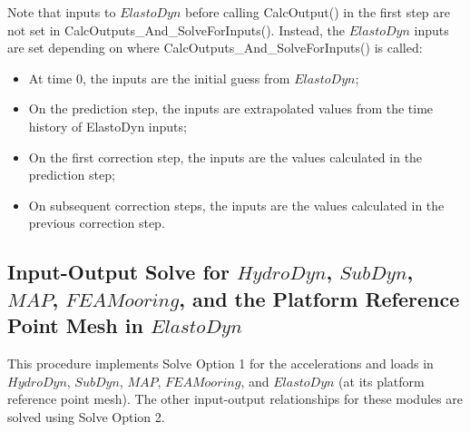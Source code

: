 \documentclass[10pt,letterpaper,oneside,notitlepage]{article}
\begin{document}
Note that inputs to $ElastoDyn$ before calling CalcOutput() in the first step are not set in CalcOutputs\_And\_SolveForInputs(). 
Instead, the $ElastoDyn$ inputs are set depending on where CalcOutputs\_And\_SolveForInputs() is called:
\begin{itemize}[noitemsep] %
	\item At time 0, the inputs are the initial guess from $ElastoDyn$;
	\item On the prediction step, the inputs are extrapolated values from the time history of ElastoDyn inputs;
	\item On the first correction step, the inputs are the values calculated in the prediction step;
	\item On subsequent correction steps, the inputs are the values calculated in the previous correction step.
\end{itemize}


\subsection {Input-Output Solve for $HydroDyn$, $SubDyn$, $MAP$, $FEAMooring$, and the Platform Reference Point Mesh in $ElastoDyn$}
This procedure implements Solve Option 1 for the accelerations and loads in
$HydroDyn$, $SubDyn$, $MAP$, $FEAMooring$, and $ElastoDyn$ (at its platform reference point mesh). 
The other input-output relationships for these modules are solved using Solve Option 2.
\end{document}
